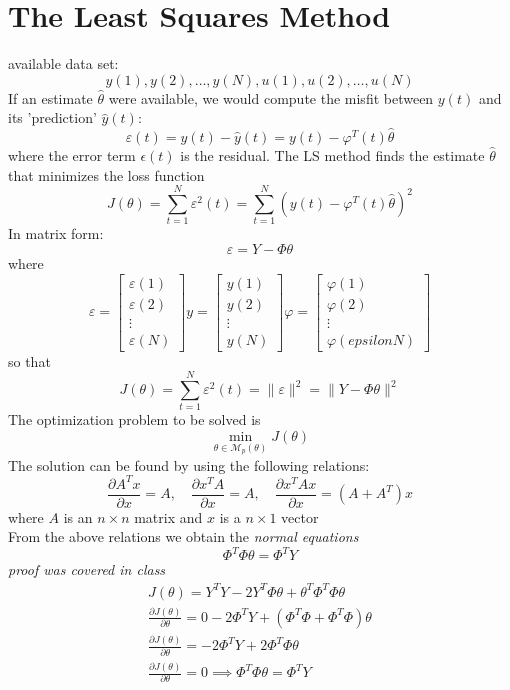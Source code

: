 \documentclass{book}
\theoremstyle{definition}
\theoremstyle{remark}
\theoremstyle{remark}
\begin{document}
\section{The Least Squares Method}
available data set:
\[
    y(1),y(2),\dots,y(N),u(1),u(2),\dots,u(N)
\]
If an estimate $\hat{\theta}$ were available, we would compute the misfit between $y(t)$ and its 'prediction' $\hat{y}(t)$:
\[
    \varepsilon(t)=y(t)-\hat{y}(t)=y(t)-\varphi^T(t)\hat{\theta}
\]
where the error term $\epsilon(t)$ is the residual. The LS method finds the estimate $\hat{\theta}$ that minimizes the loss function
\begin{equation}
    J(\theta)=\sum_{t=1}^N \varepsilon^2(t)=\sum_{t=1}^N (y(t)-\varphi^T(t)\hat{\theta})^2
\end{equation}
In matrix form:
\[
    \varepsilon=Y-\Phi \theta
\]
where
\[
    \varepsilon = \begin{bmatrix}
        \varepsilon(1) \\ \varepsilon(2) \\ \vdots \\ \varepsilon(N)
    \end{bmatrix}
    y= \begin{bmatrix}
       y(1) \\ y(2) \\ \vdots \\ y(N)
    \end{bmatrix}
    \varphi = \begin{bmatrix}
        \varphi (1) \\ \varphi(2) \\ \vdots \\ \varphi(epsilonN)
    \end{bmatrix}
\]
so that
\begin{equation}
    J(\theta)=\sum_{t=1}^N \varepsilon^2(t)=\|\varepsilon\|^2=\| Y-\Phi \theta \|^2
\end{equation}
The optimization problem to be solved is
\[
    \min_{\theta \in \mathcal{M}_p(\theta)}J(\theta)
\]
The solution can be found by using the following relations:
\[
    \frac{\partial A^Tx}{\partial x} =A, \quad \frac{\partial x^T A}{\partial x} = A, \quad \frac{\partial x^TAx}{\partial x} = (A+A^T)x
\]
where $A$ is an $n \times n$ matrix and $x$ is a $n \times 1$ vector\\
From the above relations we obtain the \emph{normal equations}
\[
    \Phi^T\Phi\theta=\Phi^TY
\]
\emph{proof was covered in class}\\
\begin{gather*}
    J(\theta)=Y^TY-2Y^T\Phi\theta+\theta^T\Phi^T\Phi\theta\\
    \frac{\partial J(\theta)}{\partial\theta}= 0 -2\Phi^TY+(\Phi^T\Phi + \Phi^T\Phi)\theta\\
    \frac{\partial J(\theta)}{\partial\theta}= -2\Phi^TY + 2\Phi^T\Phi \theta\\
    \frac{\partial J(\theta)}{\partial\theta}=0 \implies \Phi^T\Phi \theta =\Phi^TY
\end{gather*}
\end{document}
